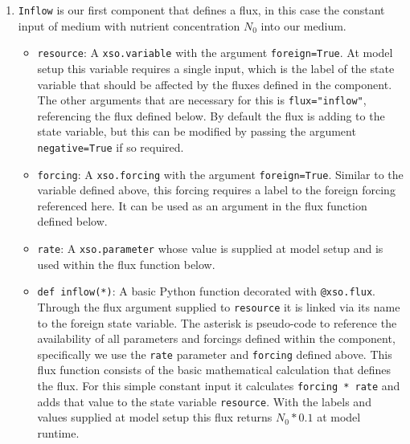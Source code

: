 \documentclass[journal abbreviation, manuscript]{copernicus}
\begin{document}
\begin{enumerate}
    \item \texttt{Inflow} is our first component that defines a flux, in this case the constant input of medium with nutrient concentration $N_0$ into our medium.
    \begin{itemize}
        \item \texttt{resource}: A \texttt{xso.variable} with the argument \texttt{foreign=True}. At model setup this variable requires a single input, which is the label of the state variable that should be affected by the fluxes defined in the component. The other arguments that are necessary for this is \texttt{flux="inflow"}, referencing the flux defined below. By default the flux is adding to the state variable, but this can be modified by passing the argument \texttt{negative=True} if so required.
        \item \texttt{forcing}: A \texttt{xso.forcing} with the argument \texttt{foreign=True}. Similar to the variable defined above, this forcing requires a label to the foreign forcing referenced here. It can be used as an argument in the flux function defined below.
        \item \texttt{rate}: A \texttt{xso.parameter} whose value is supplied at model setup and is used within the flux function below.
        \item \texttt{def inflow(*)}: A basic Python function decorated with \texttt{@xso.flux}. Through the flux argument supplied to \texttt{resource} it is linked via its name to the foreign state variable. The asterisk is pseudo-code to reference the availability of all parameters and forcings defined within the component, specifically we use the \texttt{rate} parameter and \texttt{forcing} defined above. This flux function consists of the basic mathematical calculation that defines the flux. For this simple constant input it calculates \texttt{forcing * rate} and adds that value to the state variable \texttt{resource}. With the labels and values supplied at model setup this flux returns $N_0 * 0.1$ at model runtime.
    \end{itemize}
    

\end{enumerate}
\end{document}
